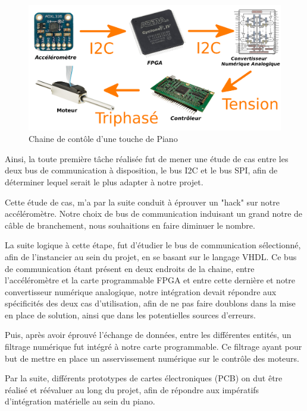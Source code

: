 \documentclass[french,a4paper,12pt]{report}
\begin{document}
	\begin{figure}[!ht]
    \center
  	\includegraphics[width=17cm]{CH.png}
    \caption{Chaine de contôle d'une touche de Piano}
	\end{figure}	
	
	Ainsi, la toute première tâche réalisée fut de mener une étude de cas entre les deux bus de communication à disposition, le bus I2C et le bus SPI, afin de déterminer lequel serait le plus adapter à notre projet.
	
	Cette étude de cas, m'a par la suite conduit à éprouver un "hack" sur notre accéléromètre. Notre choix de bus de communication induisant un grand notre de câble de branchement, nous souhaitions en faire diminuer le nombre.
	
	La suite logique à cette étape, fut d'étudier le bus de communication sélectionné, afin de l'instancier au sein du projet, en se basant sur le langage VHDL. Ce bus de communication étant présent en deux endroits de la chaine, entre l'accéléromètre et la carte programmable FPGA et entre cette dernière et notre convertisseur numérique analogique, notre intégration devait répondre aux spécificités des deux cas d'utilisation, afin de ne pas faire doublons dans la mise en place de solution, ainsi que dans les potentielles sources d'erreurs.
	
	Puis, après avoir éprouvé l'échange de données, entre les différentes entités, un filtrage numérique fut intégré à notre carte programmable. Ce filtrage ayant pour but de mettre en place un asservissement numérique sur le contrôle des moteurs.

	Par la suite, différents prototypes de cartes électroniques (PCB) on dut être réalisé et réévaluer au long du projet, afin de répondre aux impératifs d'intégration matérielle au sein du piano.
	
\end{document}
